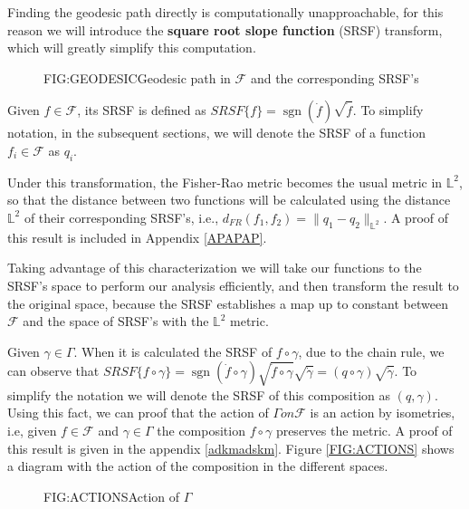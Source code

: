 Finding the geodesic path directly is computationally unapproachable,
for this reason we will introduce the \textbf{square root slope function} (SRSF)
transform, which will greatly simplify this computation.

\begin{figure}[Geodesic path in $\mathcal{F}$]{FIG:GEODESIC}{Geodesic path in $\mathcal{F}$ and the corresponding SRSF's}
   \quad
\end{figure}


Given $f \in \mathcal{F}$, its SRSF is defined as
$SRSF\{f\} = \operatorname{sgn}{(\dot f)} \sqrt{\dot f}$. To simplify notation, in the
subsequent sections, we will denote the SRSF of a function
$f_i \in \mathcal{F}$ as $q_i$.

Under this transformation, the Fisher-Rao metric becomes the usual metric
in $\mathbb{L}^2$, so that the distance between two functions will be
calculated using the distance $\mathbb{L}^2$ of their corresponding
SRSF's, i.e.,  $d_{FR}(f_1, f_2) = \| q_1 - q_2 \|_{\mathbb{L}^2}$. A proof of
this result is included in Appendix \ref{APAPAP}.

Taking advantage of this characterization we will take our functions to the
SRSF's space to perform our analysis efficiently, and then transform the result
to the original space, because the SRSF establishes a map up to constant between
$\mathcal{F}$ and the space of SRSF's with the $\mathbb{L}^2$ metric.

Given $\gamma \in \Gamma$. When it is calculated the SRSF of $f \circ \gamma$,
due to the chain rule, we can observe that
$SRSF\{f \circ \gamma\} = \operatorname{sgn}(\dot{f} \circ \gamma) \sqrt{\dot f \circ \gamma}
\sqrt{\dot \gamma} = (q \circ \gamma) \sqrt{\dot \gamma}$. To simplify the
notation we  will denote the SRSF of this composition as $(q, \gamma)$.
Using this fact, we can proof that the action of $\Gamma on \mathscr{F}$ is an
action by isometries, i.e, given $f  \in \mathscr{F}$ and $\gamma \in \Gamma$
the composition $f \circ \gamma$ preserves the metric.
A proof of this result is given in the appendix \ref{adkmadskm}.
Figure \ref{FIG:ACTIONS} shows a diagram with the action of the composition
in the different spaces.

\begin{figure}[Action of $\Gamma$]{FIG:ACTIONS}{Action of $\Gamma$}


\end{figure}
